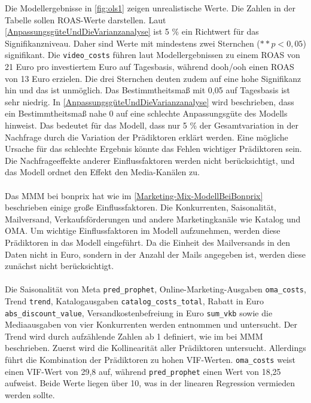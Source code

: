 Die Modellergebnisse in \autoref{fig:ols1} zeigen unrealistische Werte. Die Zahlen in der Tabelle sollen \ac{ROAS}-Werte darstellen. Laut \autoref{AnpassungsgüteUndDieVarianzanalyse} ist 5 \% ein Richtwert für das Signifikanzniveau. Daher sind Werte mit mindestens zwei Sternchen (\(**p < 0,05\)) signifikant. Die \verb|video_costs| führen laut Modellergebnissen zu einem \ac{ROAS} von 21 Euro pro investiertem Euro auf Tagesbasis, während \ac{dooh}/\ac{ooh} einen \ac{ROAS} von 13 Euro erzielen. Die drei Sternchen deuten zudem auf eine hohe Signifikanz hin und das ist unmöglich. Das Bestimmtheitsmaß mit 0,05 auf Tagesbasis ist sehr niedrig. In \autoref{AnpassungsgüteUndDieVarianzanalyse} wird beschrieben, dass ein Bestimmtheitsmaß nahe 0 auf eine schlechte Anpassungsgüte des Modells hinweist. Das bedeutet für das Modell, dass nur 5 \% der Gesamtvariation in der Nachfrage durch die Variation der Prädiktoren erklärt werden. Eine mögliche Ursache für das schlechte Ergebnis könnte das Fehlen wichtiger Prädiktoren sein. Die Nachfrageeffekte anderer Einflussfaktoren werden nicht berücksichtigt, und das Modell ordnet den Effekt den Media-Kanälen zu.\\\\
Das \ac{MMM} bei bonprix hat wie im \autoref{Marketing-Mix-ModellBeiBonprix} beschrieben einige große Einflussfaktoren. Die Konkurrenten, Saisonalität,  Mailversand, Verkaufsförderungen und andere Marketingkanäle wie Katalog und \ac{OMA}. Um wichtige Einflussfaktoren im Modell aufzunehmen, werden diese Prädiktoren in das Modell eingeführt. Da die Einheit des Mailversands in den Daten nicht in Euro, sondern in der Anzahl der Mails angegeben ist, werden diese zunächst nicht berücksichtigt. \\\\
Die Saisonalität von Meta \verb|pred_prophet|, Online-Marketing-Ausgaben \verb|oma_costs|, Trend \verb|trend|, Katalogausgaben \verb|catalog_costs_total|, Rabatt in Euro \verb|abs_discount_value|, Versandkostenbefreiung in Euro \verb|sum_vkb| sowie die Mediaausgaben von vier Konkurrenten werden entnommen und untersucht. Der Trend wird durch aufzählende Zahlen ab 1 definiert, wie im  bei \ac{MMM} beschrieben. Zuerst wird die Kollinearität aller Prädiktoren untersucht. Allerdings führt die Kombination der Prädiktoren zu hohen \ac{VIF}-Werten. \verb|oma_costs| weist einen \ac{VIF}-Wert von 29,8 auf, während \verb|pred_prophet| einen Wert von 18,25 aufweist. Beide Werte liegen über 10, was in der linearen Regression vermieden werden sollte.
